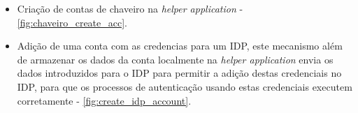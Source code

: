 \begin{itemize}
    \item Criação de contas de chaveiro na \textit{helper application} - \ref{fig:chaveiro_create_acc}.
    \item Adição de uma conta com as credencias para um IDP, este mecanismo além de armazenar os dados da conta localmente na \textit{helper application} envia os dados introduzidos para o IDP para permitir a adição destas credenciais no IDP, para que os processos de autenticação usando estas credenciais executem corretamente - \ref{fig:create_idp_account}.
\end{itemize}


\begin{figure}[H]
    \centering
    \hfill
\end{figure}